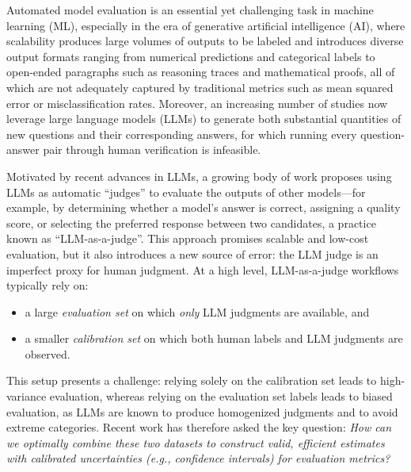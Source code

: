 \documentclass[11pt]{article}
\newcommand{\1}{\mathbf{1}}
\theoremstyle{remark}
\begin{document}
Automated model evaluation is an essential yet challenging task in machine learning (ML), especially in the era of generative artificial intelligence (AI), where scalability produces large volumes of outputs to be labeled and introduces diverse output formats ranging from numerical predictions and categorical labels to open-ended paragraphs such as reasoning traces and mathematical proofs, all of which are not adequately captured by traditional metrics such as mean squared error or misclassification rates. Moreover, an increasing number of studies now leverage large language models (LLMs) to generate both substantial quantities of new questions and their corresponding answers, for which running every question-answer pair through human verification is infeasible.

Motivated by recent advances in LLMs, a growing body of work proposes using LLMs as automatic ``judges'' to evaluate the outputs of other models---for example, by determining whether a model's answer is correct, assigning a quality score, or selecting the preferred response between two candidates, a practice known as ``LLM-as-a-judge''. This approach promises scalable and low-cost evaluation, but it also introduces a new source of error: the LLM judge is an imperfect proxy for human judgment. 
At a high level, LLM-as-a-judge workflows typically rely on:
\begin{itemize}
  \item a large \emph{evaluation set} on which \emph{only} LLM judgments are available, and
  \item a smaller \emph{calibration set} on which both human labels and LLM judgments are observed.
\end{itemize}
This setup presents a challenge: relying solely on the calibration set leads to high-variance evaluation, whereas relying on the evaluation set labels leads to biased evaluation, as LLMs are known to produce homogenized judgments and to avoid extreme categories. Recent work has therefore asked the key question: \emph{How can we optimally combine these two datasets to construct valid, efficient estimates with calibrated uncertainties (e.g., confidence intervals) for evaluation metrics?}
\end{document}
